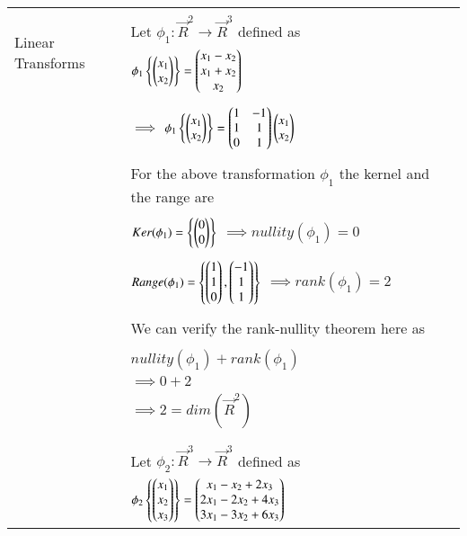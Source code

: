 	\begin{longtable}{|l|l|}
		\hline
		\multirow{3}{*}{Linear Transforms }   
		& \\ 
		& Let $\phi_1 : \vec{R}^{2} \rightarrow \vec{R}^{3}$ defined as \\ Example
		& \qquad \qquad \qquad $\phi_1 \left\{ \begin{pmatrix}x_1 \\ x_2\end{pmatrix}\right\} = \begin{pmatrix}x_1 - x_2 \\ x_1 + x_2 \\ x_2\end{pmatrix}$ \qquad \qquad \\
		& \\
		& \qquad \qquad $\implies$ $\phi_1 \left\{ \begin{pmatrix}x_1 \\ x_2\end{pmatrix}\right\} = \begin{pmatrix}1&-1 \\ 1&1 \\ 0&1\end{pmatrix}\begin{pmatrix}x_1 \\ x_2\end{pmatrix}$\\
		& \\
		& For the above transformation $\phi_1$ the kernel and the range are \\
		& \\
		& \qquad \qquad $Ker(\phi_1) = \left\{ \begin{pmatrix}0 \\ 0\end{pmatrix}\right\}$ \qquad $\implies nullity(\phi_1) = 0$\\
		& \\
		& \qquad \qquad $Range(\phi_1) = \left\{ \begin{pmatrix}1 \\ 1 \\ 0\end{pmatrix}, \begin{pmatrix}-1 \\ 1 \\ 1\end{pmatrix}\right\}$ \qquad $\implies rank(\phi_1) = 2$ \\
		& \\
		& We can verify the rank-nullity theorem here as \\
		& \\
		& \qquad \qquad \qquad $nullity(\phi_1) + rank(\phi_1)$ \\
		& \qquad \qquad $\implies 0 + 2$ \\
		& \qquad \qquad $\implies 2 = dim(\vec{R}^{2})$ \\
		& \\
		& \\
		& Let $\phi_2 : \vec{R}^{3} \rightarrow \vec{R}^{3}$ defined as \\ 
		& \qquad \qquad \qquad $\phi_2 \left\{ \begin{pmatrix}x_1 \\ x_2 \\ x_3\end{pmatrix}\right\} = \begin{pmatrix}x_1 - x_2 + 2x_3 \\ 2x_1 - 2x_2 + 4x_3 \\ 3x_1 - 3x_2 + 6x_3\end{pmatrix}$ \qquad \qquad \\

\end{longtable}
